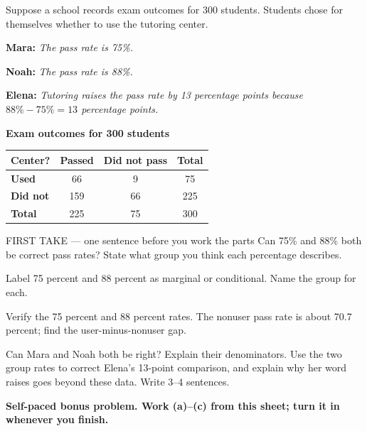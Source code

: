\documentclass[14pt]{extarticle}
\begin{document}
\pagestyle{empty}


\noindent\begin{minipage}[t]{0.57\linewidth}
\vspace{0pt}
Suppose a school records exam outcomes for 300 students. Students chose for themselves whether to use the tutoring center.\par\smallskip \textbf{Mara:} \emph{The pass rate is 75\%.}\par \textbf{Noah:} \emph{The pass rate is 88\%.}\par \textbf{Elena:} \emph{Tutoring raises the pass rate by 13 percentage points because $88\%-75\%=13$ percentage points.}\par
\end{minipage}\hfill
\begin{minipage}[t]{0.40\linewidth}
\vspace{0pt}
\begin{center}
\textbf{Exam outcomes for 300 students}\par\smallskip
\begin{tabular}{|l|c|c|c|}
\hline
\textbf{Center?} & \textbf{Passed} & \textbf{Did not pass} & \textbf{Total} \\ \hline
\textbf{Used} & 66 & 9 & 75 \\ \hline
\textbf{Did not} & 159 & 66 & 225 \\ \hline
\textbf{Total} & 225 & 75 & 300 \\ \hline
\end{tabular}
\end{center}
\end{minipage}

\begin{firsttakebox}{FIRST TAKE --- one sentence before you work the parts}
Can 75\% and 88\% both be correct pass rates? State what group you think each percentage describes.
\end{firsttakebox}

\begin{description}[leftmargin=1.15in, labelwidth=1in, itemsep=2pt, topsep=2pt]
  \item[\dokbadge{1}~(a)] Label 75 percent and 88 percent as marginal or conditional. Name the group for each.
  \item[\dokbadge{2}~(b)] Verify the 75 percent and 88 percent rates. The nonuser pass rate is about 70.7 percent; find the user-minus-nonuser gap.
  \item[\dokbadge{3}~(c)] Can Mara and Noah both be right? Explain their denominators. Use the two group rates to correct Elena's 13-point comparison, and explain why her word raises goes beyond these data. Write 3--4 sentences.
\end{description}

\vfill
\textbf{Self-paced bonus problem. Work (a)--(c) from this sheet; turn it in whenever you finish.}
\end{document}
